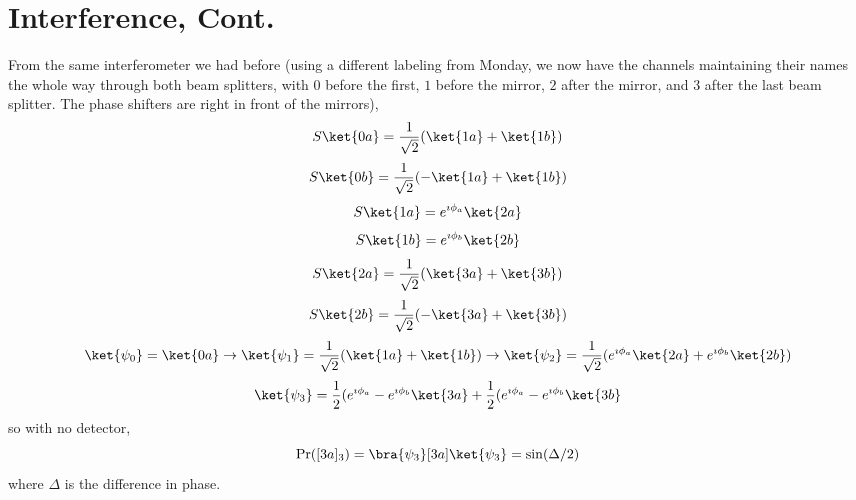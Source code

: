 \documentclass[a4paper,twoside,master.tex]{subfiles}
\begin{document}
\section{Interference, Cont.}
\label{sec:interference_cont}

From the same interferometer we had before (using a different labeling from Monday, we now have the channels maintaining their names the whole way through both beam splitters, with $ 0 $ before the first, $ 1 $ before the mirror, $ 2 $ after the mirror, and $ 3 $ after the last beam splitter. The phase shifters are right in front of the mirrors),
\begin{equation}
    S\ket{0a} = \frac{1}{\sqrt{2}} (\ket{1a} + \ket{1b})
\end{equation}
\begin{equation}
    S\ket{0b} = \frac{1}{\sqrt{2}} (-\ket{1a} + \ket{1b})
\end{equation}
\begin{equation}
    S\ket{1a} = e^{\imath\phi_a}\ket{2a}
\end{equation}
\begin{equation}
    S\ket{1b} = e^{\imath\phi_b}\ket{2b}
\end{equation}
\begin{equation}
    S\ket{2a} = \frac{1}{\sqrt{2}}(\ket{3a} + \ket{3b})
\end{equation}
\begin{equation}
    S\ket{2b} = \frac{1}{\sqrt{2}} (-\ket{3a} + \ket{3b})
\end{equation}
\begin{equation}
    \ket{\psi_0} = \ket{0a} \to \ket{\psi_1} = \frac{1}{\sqrt{2}} (\ket{1a} + \ket{1b}) \to \ket{\psi_2} = \frac{1}{\sqrt{2}} (e^{\imath\phi_a} \ket{2a} + e^{\imath\phi_b} \ket{2b})
\end{equation}
\begin{equation}
    \ket{\psi_3} = \frac{1}{2} (e^{\imath\phi_a} - e^{\imath\phi_b} \ket{3a} + \frac{1}{2} (e^{\imath\phi_a} - e^{\imath\phi_b} \ket{3b}
\end{equation}
so with no detector,
\begin{equation}
    \Pr([3a]_3) = \bra{\psi_3}[3a] \ket{\psi_3} = \sin(\Delta/2)
\end{equation}
where $\Delta$ is the difference in phase.
\end{document}
